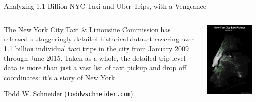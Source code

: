 \documentclass[10pt,aspectratio=169]{beamer}
\begin{document}
\begin{frame}{Analyzing 1.1 Billion NYC Taxi and Uber Trips, with a Vengeance}

  \begin{columns}
    \begin{column}{.6\textwidth}
    The New York City Taxi \& Limousine Commission has released a staggeringly
    detailed historical dataset covering over 1.1 billion individual taxi trips
    in the city from January 2009 through June 2015. Taken as a whole, the
    detailed trip-level data is more than just a vast list of taxi pickup and
    drop off coordinates: it’s a story of New York.
    \begin{flushright}
      \small \textnormal Todd W. Schneider
                         (\href{https://toddwschneider.com/posts/analyzing-1-1-billion-nyc-taxi-and-uber-trips-with-a-vengeance/}{\tt toddwschneider.com})
    \end{flushright}
    \end{column}
    \begin{column}{.3\textwidth}
      \begin{center}
        \includegraphics[width=\textwidth]{taxi_pickups_map.png}

\end{center}
\end{column}
\end{columns}
\end{frame}
\end{document}
